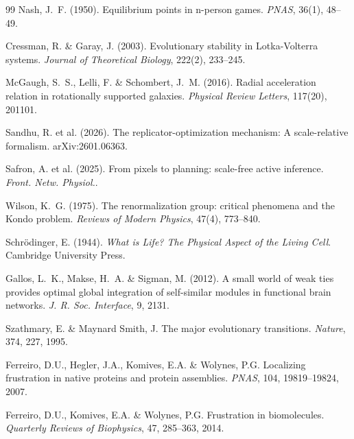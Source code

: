 \documentclass[12pt,a4paper]{article}
\theoremstyle{remark}
\begin{document}
\begin{thebibliography}{99}
Nash, J.~F. (1950).
\newblock Equilibrium points in n-person games.
\newblock \textit{PNAS}, 36(1), 48--49.

Cressman, R. \& Garay, J. (2003).
\newblock Evolutionary stability in Lotka-Volterra systems.
\newblock \textit{Journal of Theoretical Biology}, 222(2), 233--245.

McGaugh, S.~S., Lelli, F. \& Schombert, J.~M. (2016).
\newblock Radial acceleration relation in rotationally supported galaxies.
\newblock \textit{Physical Review Letters}, 117(20), 201101.

Sandhu, R. et al. (2026).
\newblock The replicator-optimization mechanism: A scale-relative formalism.
\newblock arXiv:2601.06363.

Safron, A. et al. (2025).
\newblock From pixels to planning: scale-free active inference.
\newblock \textit{Front. Netw. Physiol.}.

Wilson, K.~G. (1975).
\newblock The renormalization group: critical phenomena and the Kondo problem.
\newblock \textit{Reviews of Modern Physics}, 47(4), 773--840.

Schr\"odinger, E. (1944).
\newblock \textit{What is Life? The Physical Aspect of the Living Cell}.
\newblock Cambridge University Press.

Gallos, L.~K., Makse, H.~A. \& Sigman, M. (2012).
\newblock A small world of weak ties provides optimal global integration of self-similar modules in functional brain networks.
\newblock \textit{J. R. Soc. Interface}, 9, 2131.

Szathmary, E. \& Maynard Smith, J.
\newblock The major evolutionary transitions.
\newblock \textit{Nature}, 374, 227, 1995.

Ferreiro, D.U., Hegler, J.A., Komives, E.A. \& Wolynes, P.G.
\newblock Localizing frustration in native proteins and protein assemblies.
\newblock \textit{PNAS}, 104, 19819--19824, 2007.

Ferreiro, D.U., Komives, E.A. \& Wolynes, P.G.
\newblock Frustration in biomolecules.
\newblock \textit{Quarterly Reviews of Biophysics}, 47, 285--363, 2014.


\end{thebibliography}
\end{document}
